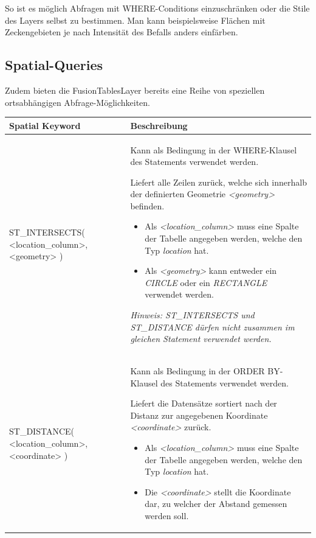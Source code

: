 So ist es möglich Abfragen mit WHERE-Conditions einzuschränken oder die Stile des Layers selbst zu bestimmen. Man kann beispielsweise Flächen mit Zeckengebieten je nach Intensität des Befalls anders einfärben.

\subsection{Spatial-Queries}
Zudem bieten die FusionTablesLayer bereits eine Reihe von speziellen ortsabhängigen Abfrage-Möglichkeiten.

\begin{tabular}{|p{4cm}|p{11cm}|}
\hline 
Spatial Keyword & Beschreibung \\ 
\hline 
ST{\_}INTERSECTS( {\textless}location{\_}column{\textgreater}, {\textless}geometry{\textgreater} ) & Kann als Bedingung in der WHERE-Klausel des Statements verwendet werden.

Liefert alle Zeilen zurück, welche sich innerhalb der definierten Geometrie \emph{{\textless}geometry{\textgreater}} befinden.

\begin{itemize}
\item Als \emph{{\textless}location{\_}column{\textgreater}} muss eine Spalte der Tabelle angegeben werden, welche den Typ \emph{location} hat.
\item Als \emph{{\textless}geometry{\textgreater}} kann entweder ein \emph{CIRCLE} oder ein \emph{RECTANGLE} verwendet werden. 
\end{itemize}

\textit{Hinweis: ST{\_}INTERSECTS und ST{\_}DISTANCE dürfen nicht zusammen im gleichen Statement verwendet werden.} \\ 
\hline 
ST{\_}DISTANCE( {\textless}location{\_}column{\textgreater}, {\textless}coordinate{\textgreater} ) & Kann als Bedingung in der ORDER BY-Klausel des Statements verwendet werden.

Liefert die Datensätze sortiert nach der Distanz zur angegebenen Koordinate \emph{{\textless}coordinate{\textgreater}} zurück.

\begin{itemize}
\item Als \emph{{\textless}location{\_}column{\textgreater}} muss eine Spalte der Tabelle angegeben werden, welche den Typ \emph{location} hat.
\item Die \emph{{\textless}coordinate{\textgreater}} stellt die Koordinate dar, zu welcher der Abstand gemessen werden soll. 
\end{itemize}


\end{tabular}
